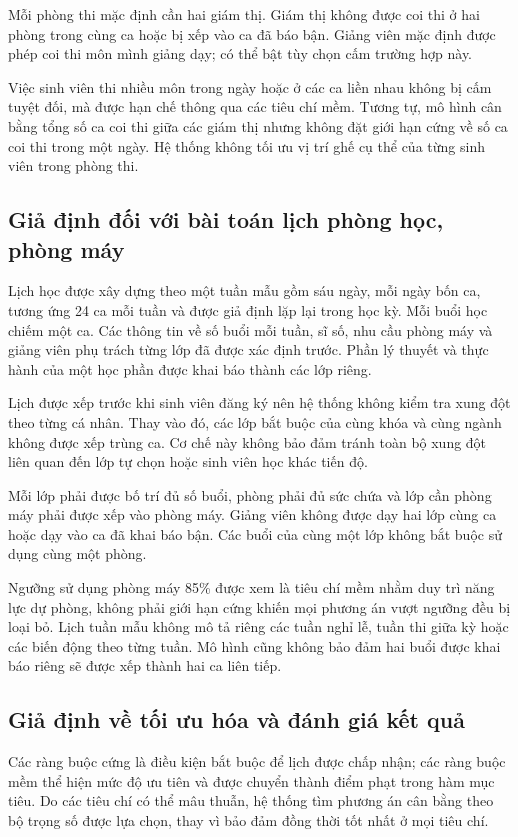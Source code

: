 Mỗi phòng thi mặc định cần hai giám thị. Giám thị không được coi thi ở hai phòng trong cùng ca hoặc bị xếp vào ca đã báo bận. Giảng viên mặc định được phép coi thi môn mình giảng dạy; có thể bật tùy chọn cấm trường hợp này.

Việc sinh viên thi nhiều môn trong ngày hoặc ở các ca liền nhau không bị cấm tuyệt đối, mà được hạn chế thông qua các tiêu chí mềm. Tương tự, mô hình cân bằng tổng số ca coi thi giữa các giám thị nhưng không đặt giới hạn cứng về số ca coi thi trong một ngày. Hệ thống không tối ưu vị trí ghế cụ thể của từng sinh viên trong phòng thi.

\subsection{Giả định đối với bài toán lịch phòng học, phòng máy}

Lịch học được xây dựng theo một tuần mẫu gồm sáu ngày, mỗi ngày bốn ca, tương ứng 24 ca mỗi tuần và được giả định lặp lại trong học kỳ. Mỗi buổi học chiếm một ca. Các thông tin về số buổi mỗi tuần, sĩ số, nhu cầu phòng máy và giảng viên phụ trách từng lớp đã được xác định trước. Phần lý thuyết và thực hành của một học phần được khai báo thành các lớp riêng.

Lịch được xếp trước khi sinh viên đăng ký nên hệ thống không kiểm tra xung đột theo từng cá nhân. Thay vào đó, các lớp bắt buộc của cùng khóa và cùng ngành không được xếp trùng ca. Cơ chế này không bảo đảm tránh toàn bộ xung đột liên quan đến lớp tự chọn hoặc sinh viên học khác tiến độ.

Mỗi lớp phải được bố trí đủ số buổi, phòng phải đủ sức chứa và lớp cần phòng máy phải được xếp vào phòng máy. Giảng viên không được dạy hai lớp cùng ca hoặc dạy vào ca đã khai báo bận. Các buổi của cùng một lớp không bắt buộc sử dụng cùng một phòng.

Ngưỡng sử dụng phòng máy 85\% được xem là tiêu chí mềm nhằm duy trì năng lực dự phòng, không phải giới hạn cứng khiến mọi phương án vượt ngưỡng đều bị loại bỏ. Lịch tuần mẫu không mô tả riêng các tuần nghỉ lễ, tuần thi giữa kỳ hoặc các biến động theo từng tuần. Mô hình cũng không bảo đảm hai buổi được khai báo riêng sẽ được xếp thành hai ca liên tiếp.

\subsection{Giả định về tối ưu hóa và đánh giá kết quả}

Các ràng buộc cứng là điều kiện bắt buộc để lịch được chấp nhận; các ràng buộc mềm thể hiện mức độ ưu tiên và được chuyển thành điểm phạt trong hàm mục tiêu. Do các tiêu chí có thể mâu thuẫn, hệ thống tìm phương án cân bằng theo bộ trọng số được lựa chọn, thay vì bảo đảm đồng thời tốt nhất ở mọi tiêu chí.


